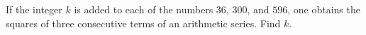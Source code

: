 If the integer $k$ is added to each of the numbers $36$, $300$, and $596$, one obtains the squares of three consecutive terms of an arithmetic series. Find $k$.